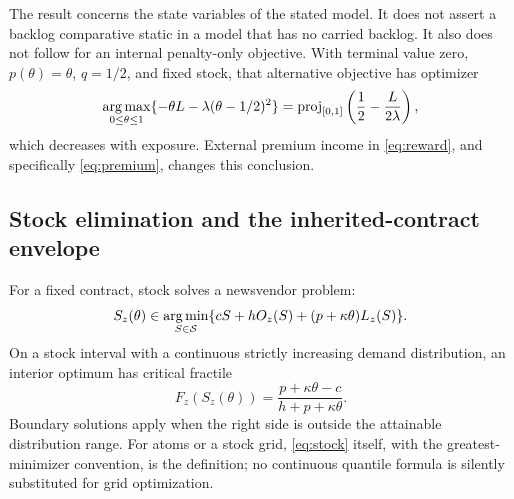 The result concerns the state variables of the stated model. It does not assert a backlog comparative static in a model that has no carried backlog. It also does not follow for an internal penalty-only objective. With terminal value zero, $p(\theta)=\theta$, $q=1/2$, and fixed stock, that alternative objective has optimizer
\begin{equation}\label{eq:penaltycounter}
 \operatorname*{arg\,max}_{0\leq\theta\leq1}\{-\theta L-\lambda(\theta-1/2)^2\}
 =\operatorname{proj}_{[0,1]}\left(\frac12-\frac{L}{2\lambda}\right),
\end{equation}
which decreases with exposure. External premium income in \eqref{eq:reward}, and specifically \eqref{eq:premium}, changes this conclusion.

\subsection{Stock elimination and the inherited-contract envelope}
For a fixed contract, stock solves a newsvendor problem:
\begin{equation}\label{eq:stock}
 S_z(\theta)\in\operatorname*{arg\,min}_{S\in\mathcal S}\{cS+hO_z(S)+(p+\kappa\theta)L_z(S)\}.
\end{equation}
On a stock interval with a continuous strictly increasing demand distribution, an interior optimum has critical fractile
\begin{equation}\label{eq:fractile}
 F_z(S_z(\theta))=\frac{p+\kappa\theta-c}{h+p+\kappa\theta}.
\end{equation}
Boundary solutions apply when the right side is outside the attainable distribution range. For atoms or a stock grid, \eqref{eq:stock} itself, with the greatest-minimizer convention, is the definition; no continuous quantile formula is silently substituted for grid optimization.

